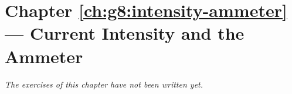 \section*{Chapter \ref{ch:g8:intensity-ammeter} --- Current Intensity and the Ammeter}


\emph{The exercises of this chapter have not been written yet.}
